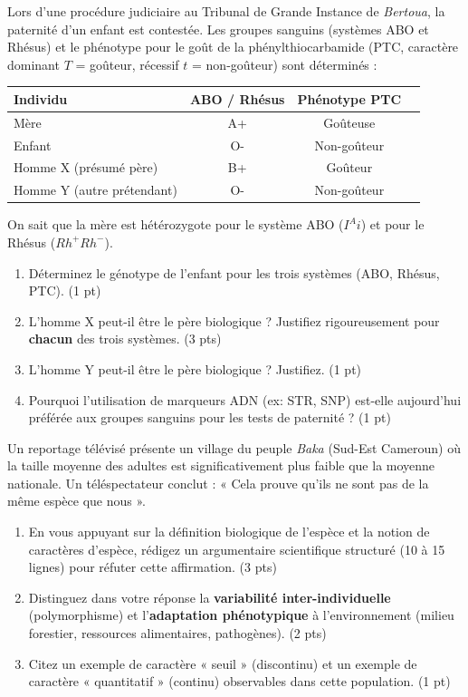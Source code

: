 \documentclass[11pt]{article}
\begin{document}
\begin{exercice}
Lors d'une procédure judiciaire au Tribunal de Grande Instance de \textit{Bertoua}, la paternité d'un enfant est contestée. Les groupes sanguins (systèmes ABO et Rhésus) et le phénotype pour le goût de la phénylthiocarbamide (PTC, caractère dominant $T$ = goûteur, récessif $t$ = non-goûteur) sont déterminés :

\begin{center}
\begin{tabular}{|l|c|c|c|}
\hline
\textbf{Individu} & \textbf{ABO / Rhésus} & \textbf{Phénotype PTC} \\
\hline
Mère & A+ & Goûteuse \\
\hline
Enfant & O- & Non-goûteur \\
\hline
Homme X (présumé père) & B+ & Goûteur \\
\hline
Homme Y (autre prétendant) & O- & Non-goûteur \\
\hline
\end{tabular}
\end{center}
On sait que la mère est hétérozygote pour le système ABO ($I^A i$) et pour le Rhésus ($Rh^+ Rh^-$).

\begin{enumerate}
    \item Déterminez le génotype de l'enfant pour les trois systèmes (ABO, Rhésus, PTC). (1 pt)
    \item L'homme X peut-il être le père biologique ? Justifiez rigoureusement pour \textbf{chacun} des trois systèmes. (3 pts)
    \item L'homme Y peut-il être le père biologique ? Justifiez. (1 pt)
    \item Pourquoi l'utilisation de marqueurs ADN (ex: STR, SNP) est-elle aujourd'hui préférée aux groupes sanguins pour les tests de paternité ? (1 pt)
\end{enumerate}
\end{exercice}

\begin{exercice}
Un reportage télévisé présente un village du peuple \textit{Baka} (Sud-Est Cameroun) où la taille moyenne des adultes est significativement plus faible que la moyenne nationale. Un téléspectateur conclut : « Cela prouve qu'ils ne sont pas de la même espèce que nous ».

\begin{enumerate}
    \item En vous appuyant sur la définition biologique de l'espèce et la notion de caractères d'espèce, rédigez un argumentaire scientifique structuré (10 à 15 lignes) pour réfuter cette affirmation. (3 pts)
    \item Distinguez dans votre réponse la \textbf{variabilité inter-individuelle} (polymorphisme) et l'\textbf{adaptation phénotypique} à l'environnement (milieu forestier, ressources alimentaires, pathogènes). (2 pts)
    \item Citez un exemple de caractère « seuil » (discontinu) et un exemple de caractère « quantitatif » (continu) observables dans cette population. (1 pt)
\end{enumerate}
\end{exercice}
\end{document}
